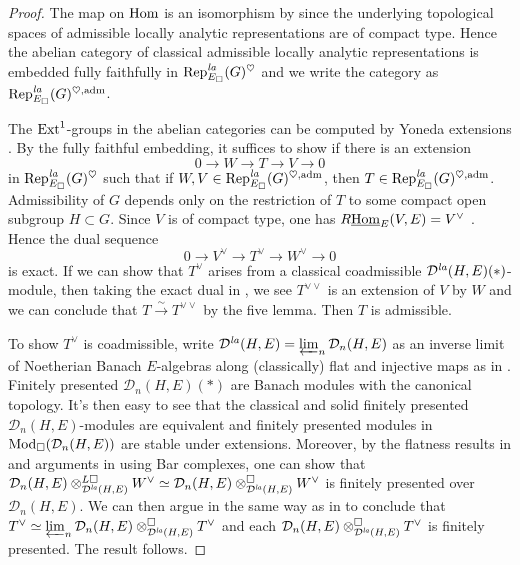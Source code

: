 \documentclass[a4paper,10pt]{amsart}
\theoremstyle{remark}
\theoremstyle{definition}
\theoremstyle{plain}
\numberwithin{equation}{section}
\newcommand{\calD}{{\mathcal D}}
\newcommand{\Ext}{{\rm Ext}}
\newcommand{\Hom}{{\rm Hom}}
\newcommand{\uHom}{\underline{\Hom}}
\newcommand{\la}{{\it la}}
\newcommand{\Mod}{{\rm Mod}}
\newcommand{\Rep}{{\rm Rep}}
\begin{document}
\begin{proof}
The map on $\Hom$ is an isomorphism by \cite[Prop.~3.7]{rodrigues2022solid} since the underlying topological spaces of  admissible locally analytic representations are of compact type. Hence the abelian category of classical admissible locally analytic representations is embedded fully faithfully in $\Rep^{\la}_{E_\square}(G)^{\heartsuit}$ and we write the category as $\Rep^{\la}_{E_\square}(G)^{\heartsuit,\mathrm{adm}} $.

The $\Ext^1$-groups in the abelian categories can be computed by Yoneda extensions \cite[\href{https://stacks.math.columbia.edu/tag/06XU}{Tag 06XU}]{stacks-project}. By the fully faithful embedding, it suffices to show if there is an extension 
\[0\rightarrow W\rightarrow T\rightarrow V\rightarrow 0\]
in $\Rep^{\la}_{E_\square}(G)^{\heartsuit} $ such that if $W,V\in \Rep^{\la}_{E_\square}(G)^{\heartsuit,\mathrm{adm}} $, then $T\in \Rep^{\la}_{E_\square}(G)^{\heartsuit,\mathrm{adm}}$. Admissibility of $G$ depends only on the restriction of $T$ to some compact open subgroup $H\subset G$. Since $V$ is of compact type, one has $R\uHom_{E}(V,E)=V^{\vee}$ \cite[Lem.~3.27]{rodrigues2022solid}. Hence the dual sequence 
\[0\rightarrow V^{\vee}\rightarrow T^{\vee}\rightarrow W^{\vee}\rightarrow 0\]
is exact. If we can show that $T^{\vee}$ arises from a classical coadmissible $\calD^{\la}(H,E)(*)$-module, then taking the exact dual in \cite[Thm.~3.40]{rodrigues2022solid}, we see $T^{\vee\vee}$ is an extension of $V$ by $W$ and we can conclude that $T\xrightarrow{\sim}T^{\vee\vee}$ by the five lemma. Then $T$ is admissible.

To show $T^{\vee}$ is coadmissible, write $\calD^{\la}(H,E)=\varprojlim_n \calD_{n}(H,E)$ as an inverse limit of Noetherian Banach $E$-algebras along (classically) flat and injective maps as in \cite{ST03}. Finitely presented $\calD_n(H,E)(*)$ are Banach modules with the canonical topology. It's then easy to see that the classical and solid finitely presented $\calD_n(H,E)$-modules are equivalent and finitely presented modules in $\Mod_{\square}(\calD_n(H,E))$ are stable under extensions. Moreover, by the flatness results in \cite[Rem.~3.2]{ST03} and arguments in \cite[Prop.~5.33]{bode2026sixoperations} using Bar complexes, one can show that $\calD_n(H,E)\otimes_{\calD^{\la}(H,E)}^{L\square}W^{\vee}\simeq \calD_n(H,E)\otimes_{\calD^{\la}(H,E)}^{\square}W^{\vee}$ is finitely presented over $\calD_n(H,E)$. We can then argue in the same way as in \cite[Lem.~2.1.1]{BreuilExt1} to conclude that $T^{\vee}\simeq \varprojlim_n \calD_n(H,E)\otimes_{\calD^{\la}(H,E)}^{\square}T^{\vee}$ and each $\calD_n(H,E)\otimes_{\calD^{\la}(H,E)}^{\square}T^{\vee}$ is finitely presented. The result follows.
\end{proof}
\end{document}
